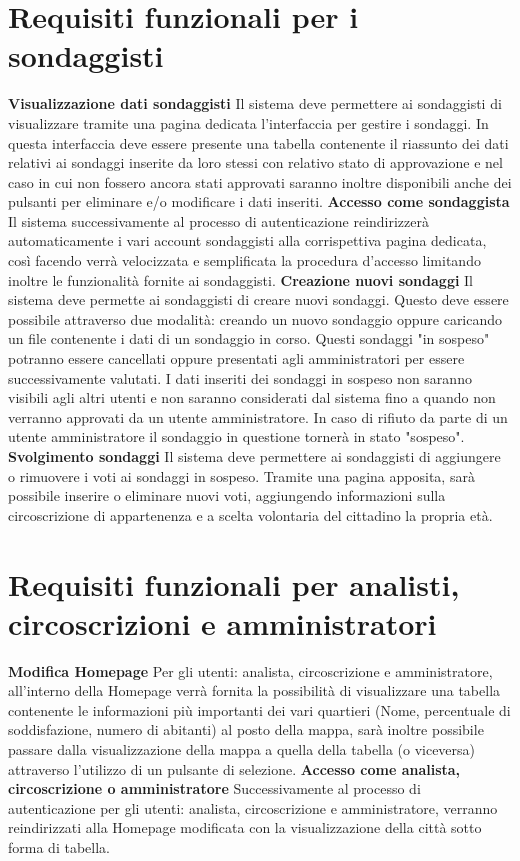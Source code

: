     \section{Requisiti funzionali per i sondaggisti}
        \begin{rfList}
            \rfItem \textbf{Visualizzazione dati sondaggisti} Il sistema deve permettere ai sondaggisti di visualizzare tramite una pagina dedicata l'interfaccia per gestire i sondaggi. In questa interfaccia deve essere presente una tabella contenente il riassunto dei dati relativi ai sondaggi inserite da loro stessi con relativo stato di approvazione e nel caso in cui non fossero ancora stati approvati saranno inoltre disponibili anche dei pulsanti per eliminare e/o modificare i dati inseriti.
            \rfItem \textbf{Accesso come sondaggista} Il sistema successivamente al processo di autenticazione reindirizzerà automaticamente i vari account sondaggisti alla corrispettiva pagina dedicata, così facendo verrà velocizzata e semplificata la procedura d'accesso limitando inoltre le funzionalità fornite ai sondaggisti.
            \rfItem \textbf{Creazione nuovi sondaggi} Il sistema deve permette ai sondaggisti di creare nuovi sondaggi. Questo deve essere possibile attraverso due modalità: creando un nuovo sondaggio oppure caricando un file contenente i dati di un sondaggio in corso. Questi sondaggi "in sospeso" potranno essere cancellati oppure presentati agli amministratori per essere successivamente valutati. I dati inseriti dei sondaggi in sospeso non saranno visibili agli altri utenti e non saranno considerati dal sistema fino a quando non verranno approvati da un utente amministratore. In caso di rifiuto da parte di un utente amministratore il sondaggio in questione tornerà in stato "sospeso". 
            \rfItem \textbf{Svolgimento sondaggi} Il sistema deve permettere ai sondaggisti di aggiungere o rimuovere i voti ai sondaggi in sospeso. Tramite una pagina apposita, sarà possibile inserire o eliminare nuovi voti, aggiungendo informazioni sulla circoscrizione di appartenenza e a scelta volontaria del cittadino la propria età.
        \end{rfList}
    \section{Requisiti funzionali per analisti, circoscrizioni e amministratori}
        \begin{rfList}
            \rfItem \textbf{Modifica Homepage} Per gli utenti: analista, circoscrizione e amministratore, all'interno della Homepage verrà fornita la possibilità di visualizzare una tabella contenente le informazioni più importanti dei vari quartieri (Nome, percentuale di soddisfazione, numero di abitanti) al posto della mappa, sarà inoltre possibile passare dalla visualizzazione della mappa a quella della tabella (o viceversa) attraverso l'utilizzo di un pulsante di selezione.
            \rfItem \textbf{Accesso come analista, circoscrizione o amministratore} Successivamente al processo di autenticazione per gli utenti: analista, circoscrizione e amministratore, verranno reindirizzati alla Homepage modificata con la visualizzazione della città sotto forma di tabella.
        \end{rfList}
